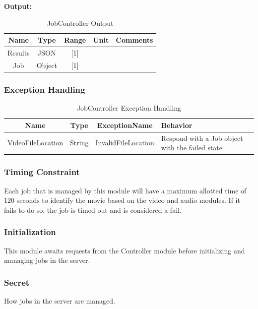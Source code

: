 \documentclass{article}
\begin{document}
\textbf{Output:}
\begin{table}[H]
    \caption{JobController Output}
    \centering
    \begin{tabularx}{0.7\textwidth}{|c|c|c|c|X|} \hline
        \textbf{Name} & \textbf{Type} & \textbf{Range} & \textbf{Unit} & \textbf{Comments} \\ \hline
        Results & JSON & [1] & & \\ \hline
        Job & Object & [1] & & \\ \hline
    \end{tabularx}
    \label{tab:JobController_Output}
\end{table}

\subsubsection{Exception Handling}
\begin{table}[H]
    \caption{JobController Exception Handling}
    \centering
    \begin{tabularx}{0.7\textwidth}{|c|c|c|X|} \hline
        \textbf{Name} & \textbf{Type} & \textbf{ExceptionName} & \textbf{Behavior} \\ \hline
        VideoFileLocation & String & InvalidFileLocation & Respond with a Job object with the failed state \\ \hline
    \end{tabularx}
    \label{tab:JobController_Exception}
\end{table}

\subsubsection{Timing Constraint}
Each job that is managed by this module will have a maximum allotted time of 120 seconds to identify the movie based on the video and audio modules. If it fails to do so, the job is timed out and is considered a fail. 

\subsubsection{Initialization}
This module awaits requests from the Controller module before initializing and managing jobs in the server.

\subsubsection{Secret}
How jobs in the server are managed.
\end{document}
